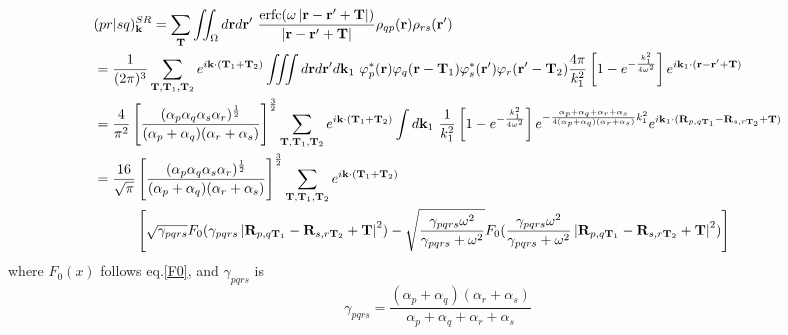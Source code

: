\documentclass{article}
\begin{document}
            \begin{align}
                &(pr|sq)_{\textbf{k}}^{SR} = \sum_{\textbf{T}}\iint_{\Omega}d\textbf{r}d\textbf{r}'\ 
                \frac{{\rm erfc}(\omega\left|\textbf{r}-\textbf{r}'+\textbf{T}\right|)}{\left|\textbf{r}-\textbf{r}'+\textbf{T}\right|}
                \rho_{qp}(\textbf{r})\rho_{rs}(\textbf{r}')\notag\\
                &= \frac{1}{(2\pi)^3}\sum_{\textbf{T},\textbf{T}_1,\textbf{T}_2}e^{i\textbf{k}\cdot(\textbf{T}_1+\textbf{T}_2)}
                \iiint d\textbf{r}d\textbf{r}'d\textbf{k}_1\ \varphi_p^*(\textbf{r})\varphi_q(\textbf{r}-\textbf{T}_1)
                \varphi_s^*(\textbf{r}')\varphi_r(\textbf{r}'-\textbf{T}_2)
                \frac{4\pi}{k_1^2}\left[1-e^{-\frac{k_1^2}{4\omega^2}}\right]e^{i\textbf{k}_1\cdot(\textbf{r}-\textbf{r}'+\textbf{T})}\notag\\
                &= \frac{4}{\pi^2}\left[\frac{(\alpha_p\alpha_q\alpha_s\alpha_r)^{\frac{1}{2}}}{(\alpha_p+\alpha_q)(\alpha_r+\alpha_s)}\right]^{\frac{3}{2}}
                \sum_{\textbf{T},\textbf{T}_1,\textbf{T}_2}e^{i\textbf{k}\cdot(\textbf{T}_1+\textbf{T}_2)}
                \int d\textbf{k}_1\ \frac{1}{k_1^2}\left[1-e^{-\frac{k_1^2}{4\omega^2}}\right]
                e^{-\frac{\alpha_p+\alpha_q+\alpha_r+\alpha_s}{4(\alpha_p+\alpha_q)(\alpha_r+\alpha_s)}k_1^2}
                e^{i\textbf{k}_1\cdot(\textbf{R}_{p,q\textbf{T}_1}-\textbf{R}_{s,r\textbf{T}_2}+\textbf{T})}\notag\\
                &= \frac{16}{\sqrt{\pi}}\left[\frac{(\alpha_p\alpha_q\alpha_s\alpha_r)^{\frac{1}{2}}}{(\alpha_p+\alpha_q)(\alpha_r+\alpha_s)}\right]^{\frac{3}{2}}
                \sum_{\textbf{T},\textbf{T}_1,\textbf{T}_2}e^{i\textbf{k}\cdot(\textbf{T}_1+\textbf{T}_2)}\notag\\
                &\qquad\quad\left[\sqrt{\gamma_{pqrs}}F_0(\gamma_{pqrs}\left|\textbf{R}_{p,q\textbf{T}_1}-\textbf{R}_{s,r\textbf{T}_2}+\textbf{T}\right|^2)
                -\sqrt{\frac{\gamma_{pqrs}\omega^2}{\gamma_{pqrs}+\omega^2}}F_0(\frac{\gamma_{pqrs}\omega^2}{\gamma_{pqrs}+\omega^2}
                \left|\textbf{R}_{p,q\textbf{T}_1}-\textbf{R}_{s,r\textbf{T}_2}+\textbf{T}\right|^2)\right]
            \end{align}
            where $F_0(x)$ follows eq.\eqref{F0}, and $\gamma_{pqrs}$ is
            \begin{equation}
                \gamma_{pqrs} = \frac{(\alpha_p+\alpha_q)(\alpha_r+\alpha_s)}{\alpha_p+\alpha_q+\alpha_r+\alpha_s}
            \end{equation}
            
\end{document}

